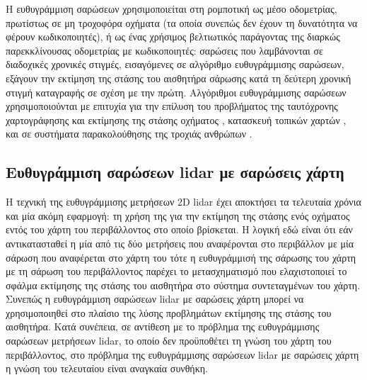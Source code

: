 \begin{gg_box}
\begin{remark}
Η ευθυγράμμιση σαρώσεων χρησιμοποιείται στη ρομποτική ως μέσο οδομετρίας,
πρωτίστως σε μη τροχοφόρα οχήματα (τα οποία συνεπώς δεν έχουν τη δυνατότητα να
φέρουν κωδικοποιητές), ή ως ένας χρήσιμος βελτιωτικός παράγοντας της διαρκώς
παρεκκλίνουσας οδομετρίας με κωδικοποιητές: σαρώσεις που λαμβάνονται σε
διαδοχικές χρονικές στιγμές, εισαγόμενες σε αλγόριθμο ευθυγράμμισης
σαρώσεων, εξάγουν την εκτίμηση της στάσης του αισθητήρα σάρωσης κατά τη
δεύτερη χρονική στιγμή καταγραφής σε σχέση με την πρώτη. Αλγόριθμοι
ευθυγράμμισης σαρώσεων χρησιμοποιούνται με επιτυχία για την επίλυση του
προβλήματος της ταυτόχρονης χαρτογράφησης και εκτίμησης της στάσης οχήματος
\cite{Gutmann,Hahnel,Chieh-ChihWang}, κατασκευή τοπικών χαρτών
\cite{Lacroix2002a,Minguez,Montesano2008a}, και σε συστήματα παρακολούθησης της
τροχιάς ανθρώπων \cite{Schulz}.
\end{remark}
\end{gg_box}



\subsection{Ευθυγράμμιση σαρώσεων lidar με σαρώσεις χάρτη}
\label{subsec:01_01_02_6}

Η τεχνική της ευθυγράμμισης μετρήσεων 2D lidar έχει αποκτήσει τα τελευταία
χρόνια και μία ακόμη εφαρμογή: τη χρήση της για την εκτίμηση της στάσης ενός
οχήματος εντός του χάρτη του περιβάλλοντος στο οποίο βρίσκεται. Η λογική εδώ
είναι ότι εάν αντικατασταθεί η μία από τις δύο μετρήσεις που αναφέρονται στο
περιβάλλον με μία σάρωση που αναφέρεται στο χάρτη του τότε η ευθυγράμμισή
της σάρωσης του χάρτη με τη σάρωση του περιβάλλοντος παρέχει το μετασχηματισμό
που ελαχιστοποιεί το σφάλμα εκτίμησης της στάσης του αισθητήρα στο σύστημα
συντεταγμένων του χάρτη. Συνεπώς η ευθυγράμμιση σαρώσεων lidar με σαρώσεις
χάρτη μπορεί να χρησιμοποιηθεί στο πλαίσιο της λύσης προβλημάτων εκτίμησης της
στάσης του αισθητήρα. Κατά συνέπεια, σε αντίθεση με το πρόβλημα της
ευθυγράμμισης σαρώσεων μετρήσεων lidar, το οποίο δεν προϋποθέτει τη γνώση του
χάρτη του περιβάλλοντος, στο πρόβλημα της ευθυγράμμισης σαρώσεων lidar με
σαρώσεις χάρτη η γνώση του τελευταίου είναι αναγκαία συνθήκη.



